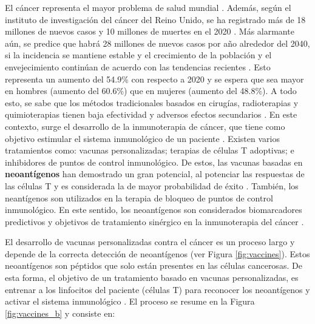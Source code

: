 \documentclass[a4paper,11pt]{article}
\begin{document}
	El cáncer representa el mayor problema de salud mundial \citep{siegel2023cancer}. Además, según el instituto de investigación del cáncer del Reino Unido, se ha registrado más de 18 millones de nuevos casos y 10 millones de muertes en el 2020 \citep{cancerUK2023}. Más alarmante aún, se predice que habrá 28 millones de nuevos casos por año alrededor del 2040, si la incidencia se mantiene estable y el crecimiento de la población y el envejecimiento continúan de acuerdo con las tendencias recientes \citep{cancerUK2023_2}. Esto representa un aumento del 54.9\% con respecto a 2020 y se espera que sea mayor en hombres (aumento del 60.6\%) que en mujeres (aumento del 48.8\%).	A todo esto, se sabe que los métodos tradicionales basados en cirugías, radioterapias y quimioterapias tienen baja efectividad y adversos efectos secundarios \citep{peng2019neoantigen}. En este contexto, surge el desarrollo de la inmunoterapia de cáncer, que tiene como objetivo estimular el sistema inmunológico de un paciente \citep{borden2022cancer}. Existen varios tratamientos como: vacunas personalizadas; terapias de células T adoptivas; e inhibidores de puntos de control inmunológico. De estos, las vacunas basadas en \textbf{neoantígenos} han demostrado un gran potencial, al potenciar las respuestas de las células T y es considerada la de mayor probabilidad de éxito \citep{borden2022cancer}. También, los neantígenos son utilizados en la terapia de bloqueo de puntos de control inmunológico. En este sentido, los neoantígenos son considerados biomarcadores predictivos y objetivos de tratamiento sinérgico en la inmunoterapia del cáncer \citep{fang2022neoantigens}.
	
	
	
	
	El desarrollo de vacunas personalizadas contra el cáncer es un proceso largo y depende de la correcta detección de neoantígenos (ver Figura \ref{fig:vaccines}). Estos neoantígenos son péptidos que solo están presentes en las células cancerosas. De esta forma, el objetivo de un tratamiento basado en vacunas personalizadas, es entrenar a los linfocitos del paciente (células T) para reconocer los neoantígenos y activar el sistema inmunológico \citep{de2020neoantigen, peng2019neoantigen}. El proceso se resume en la Figura \ref{fig:vaccines_b} y consiste en: 
	
	
	
\end{document}

